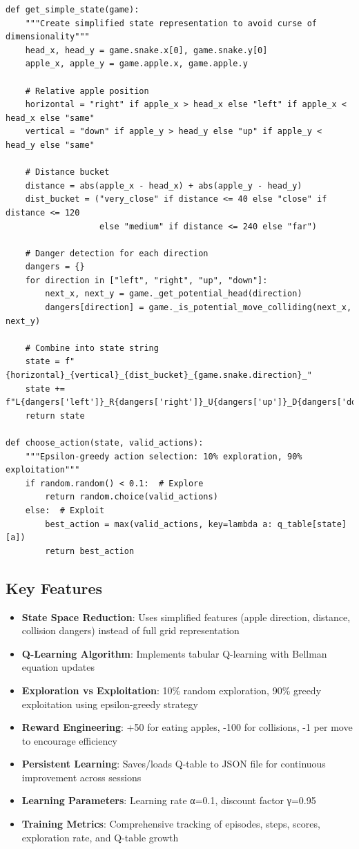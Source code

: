 \documentclass[11pt,a4paper]{article}
\begin{document}
\begin{lstlisting}[caption=Q-Learning Agent]
def get_simple_state(game):
    """Create simplified state representation to avoid curse of dimensionality"""
    head_x, head_y = game.snake.x[0], game.snake.y[0]
    apple_x, apple_y = game.apple.x, game.apple.y
    
    # Relative apple position
    horizontal = "right" if apple_x > head_x else "left" if apple_x < head_x else "same"
    vertical = "down" if apple_y > head_y else "up" if apple_y < head_y else "same"
    
    # Distance bucket
    distance = abs(apple_x - head_x) + abs(apple_y - head_y)
    dist_bucket = ("very_close" if distance <= 40 else "close" if distance <= 120 
                   else "medium" if distance <= 240 else "far")
    
    # Danger detection for each direction
    dangers = {}
    for direction in ["left", "right", "up", "down"]:
        next_x, next_y = game._get_potential_head(direction)
        dangers[direction] = game._is_potential_move_colliding(next_x, next_y)
    
    # Combine into state string
    state = f"{horizontal}_{vertical}_{dist_bucket}_{game.snake.direction}_"
    state += f"L{dangers['left']}_R{dangers['right']}_U{dangers['up']}_D{dangers['down']}"
    return state

def choose_action(state, valid_actions):
    """Epsilon-greedy action selection: 10% exploration, 90% exploitation"""
    if random.random() < 0.1:  # Explore
        return random.choice(valid_actions)
    else:  # Exploit
        best_action = max(valid_actions, key=lambda a: q_table[state][a])
        return best_action
\end{lstlisting}

\subsection{Key Features}
\begin{itemize}
\item \textbf{State Space Reduction}: Uses simplified features (apple direction, distance, collision dangers) instead of full grid representation
\item \textbf{Q-Learning Algorithm}: Implements tabular Q-learning with Bellman equation updates
\item \textbf{Exploration vs Exploitation}: 10\% random exploration, 90\% greedy exploitation using epsilon-greedy strategy
\item \textbf{Reward Engineering}: +50 for eating apples, -100 for collisions, -1 per move to encourage efficiency
\item \textbf{Persistent Learning}: Saves/loads Q-table to JSON file for continuous improvement across sessions
\item \textbf{Learning Parameters}: Learning rate α=0.1, discount factor γ=0.95
\item \textbf{Training Metrics}: Comprehensive tracking of episodes, steps, scores, exploration rate, and Q-table growth
\end{itemize}
\end{document}
